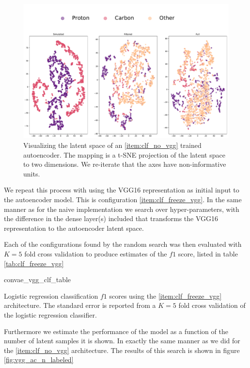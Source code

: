 \begin{figure}
\centering
\includegraphics[width=\textwidth]{plots/ac_tsne.pdf}
\caption[autoencoder latent space visualization]{Visualizing the latent space of an \ref{item:clf_no_vgg} trained autoencoder. The mapping is a t-SNE projection of the latent space to two dimensions. We re-iterate that the axes have non-informative units.}\label{fig:ac_tnse}
\end{figure}

We repeat this process with using the VGG16 representation as initial input to the autoencoder model. This is configuration \ref{item:clf_freeze_vgg}. In the same manner as for the naive implementation we search over hyper-parameters, with the difference in the dense layer(s) included that transforms the VGG16 representation to the autoencoder latent space.

Each of the configurations found by the random search was then evaluated with $K=5$ fold cross validation to produce estimates of the $f1$ score, listed in table \ref{tab:clf_freeze_vgg}

\begin{table}
\centering
{convae_vgg_clf_table}
\caption{Logistic regression classification $f1$ scores using the \ref{item:clf_freeze_vgg} architecture. The standard error is reported from a $K=5$ fold cross validation of the logistic regression classifier.}\label{tab:clf_freeze_vgg}
\end{table}

\noindent Furthermore we estimate the performance of the model as a function of the number of latent samples it is shown. In exactly the same manner as we did for the \ref{item:clf_no_vgg} architecture. The results of this search is shown in figure \ref{fig:vgg_ac_n_labeled}

